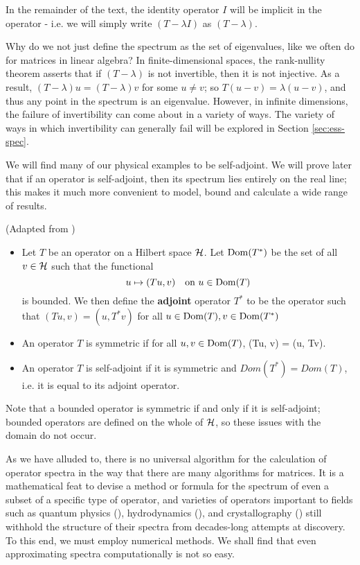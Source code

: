 \documentclass[../main.tex]{subfiles}
\begin{document}
In the remainder of the text, the identity operator $I$ will be implicit in the
operator - i.e. we will simply write $(T - \lambda I)$ as $(T - \lambda)$.

Why do we not just define the spectrum as the set of eigenvalues, like we often
do for matrices in linear algebra? In finite-dimensional spaces,
the rank-nullity theorem asserts that if $(T - \lambda)$ is not invertible, then
it is not injective. As a result, $(T - \lambda)u = (T - \lambda)v$ for some $u
\neq v$; so $T(u - v) = \lambda(u-v)$, and thus any point in the spectrum is an
eigenvalue. However, in infinite dimensions, the failure of
invertibility can come about in a variety of ways.
The variety of ways in which invertibility can generally fail will
be explored in Section \ref{sec:ess-spec}.

We will find many of our physical examples to be self-adjoint. We will prove
later that if an operator is self-adjoint, then its spectrum lies entirely on
the real line; this makes it much more convenient to model, bound and calculate
a wide range of results.

\begin{definition}
(Adapted from \cite{hall2013quantum})
  \begin{itemize}
  \item Let $T$ be an operator on a Hilbert space $\mathcal{H}$. Let $\mathrm{Dom}(T^*)$ be
    the set of all $v \in \mathcal{H}$ such that the functional
	    $$u \mapsto (Tu, v) \quad \text{on $u \in \mathrm{Dom}(T)$}$$
    is bounded. We then define the \textbf{adjoint} operator $T^*$ to be the
    operator such that 
    $(Tu, v) = (u, T^*v)$ for all $u \in \mathrm{Dom}(T), v \in \mathrm{Dom}(T^*)$ 
  \item An operator $T$ is symmetric if 
    for all $u, v \in \mathrm{Dom}(T)$, (Tu, v) = (u, Tv).
  \item An operator $T$ is self-adjoint if it is symmetric and $Dom(T^*) =
    Dom(T)$, i.e. it is equal to its adjoint operator.
  \end{itemize}
\end{definition}

Note that a bounded operator is symmetric if and only if it is self-adjoint;
bounded operators are defined on the whole of $\mathcal{H}$, so these issues with
the domain do not occur. 

As we have alluded to, there is no universal algorithm for the calculation of
operator spectra in the way that there are many algorithms 
\cite{suli2003introduction} for matrices. It is a mathematical feat to devise
a method or formula for the spectrum of even a subset of a specific type of
operator, and varieties of operators important to fields such as quantum physics
(\cite{lewin2010spectral}), hydrodynamics (\cite{manning2008descriptor}), and
crystallography (\cite{cances2012periodic}) still withhold the structure of
their spectra from decades-long attempts at discovery. 
To this end, we must employ numerical methods.
We shall find that even approximating spectra computationally is not so easy.
\end{document}
